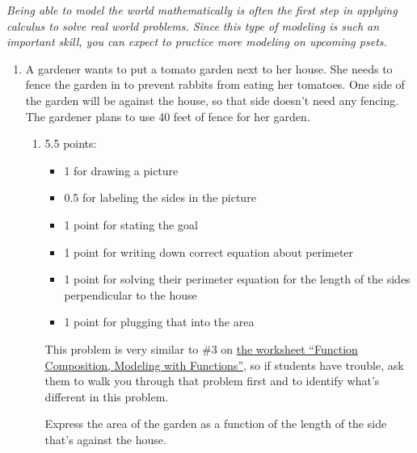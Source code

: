 \documentclass{article}
\begin{document}
\begin{problemonly}
  \emph{Being able to model the world mathematically is often the first step in applying calculus to solve real world problems. Since this type of modeling is such an important skill, you can expect to practice more modeling on upcoming psets.}
\end{problemonly}

\begin{enumerate}[resume]
\item \label{modeling-fence-3-sides} %

  A gardener wants to put a tomato garden next to her house. She needs to fence the garden in to prevent rabbits from eating her tomatoes. One side of the garden will be against the house, so that side doesn't need any fencing. The gardener plans to use 40 feet of fence for her garden.

  \begin{enumerate}
  \item
    \begin{grading}
      5.5 points:
      \begin{itemize}[nosep]
      \item 1 for drawing a picture
      \item 0.5 for labeling the sides in the picture
      \item 1 point for stating the goal
      \item 1 point for writing down correct equation about perimeter
      \item 1 point for solving their perimeter equation for the length of the sides perpendicular to the house
      \item 1 point for plugging that into the area
      \end{itemize}
    \end{grading}

    \begin{workshop}
      This problem is very similar to {{\#3}} on \href{https://people.math.harvard.edu/~jjchen/mathma/docs/worksheets/worksheet06-sols.html}{the worksheet ``Function Composition, Modeling with Functions''}, 
      so if students have trouble, ask them to walk you through that
      problem first and to identify what's different in this problem.
    \end{workshop}

    \begin{problem}[\vfill]
      Express the area of the garden as a function of the length of
      the side that's against the house.
    \end{problem}


\end{enumerate}
\end{enumerate}
\end{document}
